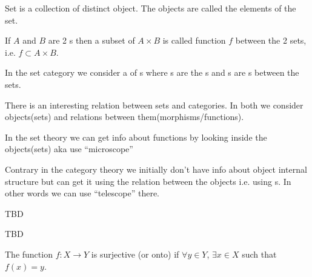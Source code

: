 \begin{definition}[Set]
\label{def:set}
Set is a collection of distinct object. The objects are called the
elements of the set.
\end{definition}

\begin{definition}[Function]
\label{def:function}
If $A$ and $B$ are 2 s then a subset of $A \times B$ is
called function $f$ between the 2 sets, i.e. $f \subset A \times B$.
\end{definition}


\begin{example}
\label{ex:setcategory}
In the set category we consider a  of
s where 
s are the s and
s are s between the sets. 
\end{example}

\begin{remark}
\label{rem:set_vs_category}
There is an interesting relation between sets and categories. In both
we consider objects(sets) and relations between
them(morphisms/functions). 

In the set theory we can get info about functions by looking inside
the objects(sets) aka use ``microscope'' \cite{bib:milewski2018category} 

Contrary in the category theory we initially don't have info about object
internal structure but can get it using the relation between the
objects i.e. using s. In other words we can use
``telescope'' \cite{bib:milewski2018category}  there.
\end{remark}

\begin{definition}[Domain]
\label{def:domain}
TBD
\end{definition}

\begin{definition}[Codomain]
\label{def:codomain}
TBD
\end{definition}


\begin{definition}[Surjection]
  \label{def:surjection}
  The function $f: X \rightarrow Y$ is surjective (or onto) if
  $\forall y \in Y$, $\exists x \in X$ such that
  $f\left(x\right) = y$.
\end{definition}

